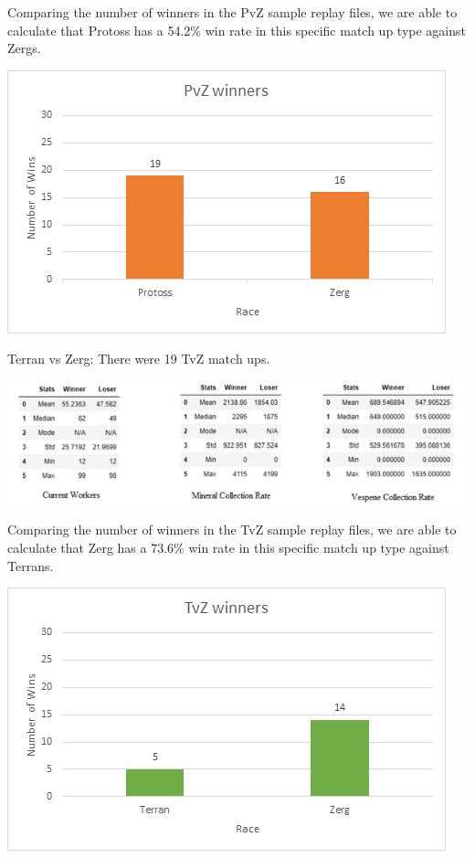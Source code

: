 \documentclass[a4paper,12pt]{report}
\begin{document}
Comparing the number of winners in the PvZ sample replay files, we are able to calculate that Protoss has a 54.2\% win rate in this specific match up type against Zergs.

\begin{center}
    \captionsetup{type=figure}
    \includegraphics[width=.9\linewidth]{media/PvZwinners.png}
\end{center}

Terran vs Zerg:
There were 19 TvZ match ups.

\begin{center}
    \captionsetup{type=figure}
    \includegraphics[width=.9\linewidth]{media/WorkersCollectionTvZ.png}
\end{center}

Comparing the number of winners in the TvZ sample replay files, we are able to calculate that Zerg has a 73.6\% win rate in this specific match up type against Terrans.

\begin{center}
    \captionsetup{type=figure}
    \includegraphics[width=.9\linewidth]{media/TvZwinrate.png}
\end{center}
\end{document}
